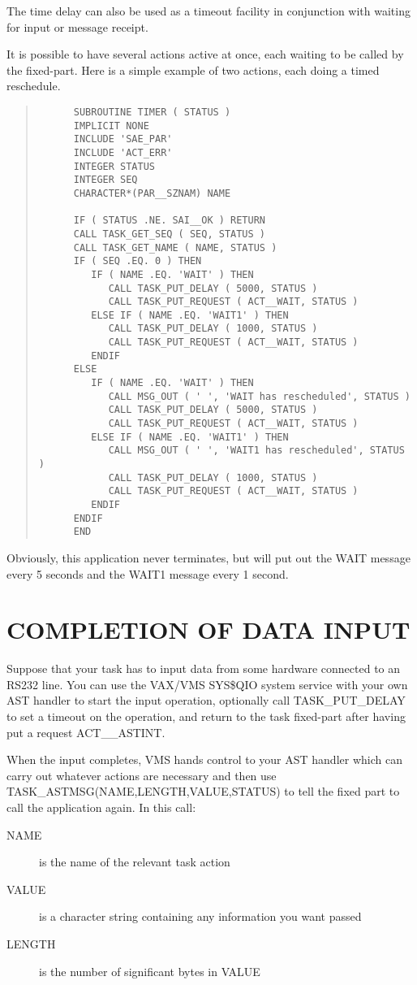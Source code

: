 The time delay can also be used as a timeout facility in conjunction
with waiting for input or message receipt. 

It is possible to have several actions active at once, each waiting to 
be called by the fixed-part. Here is a simple example of two actions, 
each doing a timed reschedule.

\small \begin{quote} \begin{verbatim}
      SUBROUTINE TIMER ( STATUS )
      IMPLICIT NONE
      INCLUDE 'SAE_PAR'
      INCLUDE 'ACT_ERR'
      INTEGER STATUS
      INTEGER SEQ
      CHARACTER*(PAR__SZNAM) NAME

      IF ( STATUS .NE. SAI__OK ) RETURN
      CALL TASK_GET_SEQ ( SEQ, STATUS )
      CALL TASK_GET_NAME ( NAME, STATUS )
      IF ( SEQ .EQ. 0 ) THEN
         IF ( NAME .EQ. 'WAIT' ) THEN
            CALL TASK_PUT_DELAY ( 5000, STATUS )
            CALL TASK_PUT_REQUEST ( ACT__WAIT, STATUS )
         ELSE IF ( NAME .EQ. 'WAIT1' ) THEN
            CALL TASK_PUT_DELAY ( 1000, STATUS )
            CALL TASK_PUT_REQUEST ( ACT__WAIT, STATUS )
         ENDIF
      ELSE
         IF ( NAME .EQ. 'WAIT' ) THEN
            CALL MSG_OUT ( ' ', 'WAIT has rescheduled', STATUS )
            CALL TASK_PUT_DELAY ( 5000, STATUS )
            CALL TASK_PUT_REQUEST ( ACT__WAIT, STATUS )
         ELSE IF ( NAME .EQ. 'WAIT1' ) THEN
            CALL MSG_OUT ( ' ', 'WAIT1 has rescheduled', STATUS )
            CALL TASK_PUT_DELAY ( 1000, STATUS )
            CALL TASK_PUT_REQUEST ( ACT__WAIT, STATUS )
         ENDIF
      ENDIF
      END
\end{verbatim} \end{quote} \normalsize

Obviously, this application never terminates, but will put out the WAIT 
message every 5 seconds and the WAIT1 message every 1 second.


\section{COMPLETION OF DATA INPUT}

Suppose that your task has to input data from some hardware connected to 
an RS232 line. You can use the VAX/VMS SYS\$QIO system service with your 
own AST handler to start the input operation, optionally call 
TASK\_PUT\_DELAY to set a timeout on the operation, and return 
to the task fixed-part after having put a request ACT\_\_ASTINT. 

When the input completes, VMS hands control to your AST handler which
can carry out whatever actions are necessary and then use 
TASK\_ASTMSG(NAME,LENGTH,VALUE,STATUS) to tell the fixed part to call the 
application again. In this call:
\begin{description}
\item[NAME] is the name of the relevant task
action
\item[VALUE] is a character string containing any information you want 
passed
\item[LENGTH] is the number of significant bytes in VALUE
\end{description}

